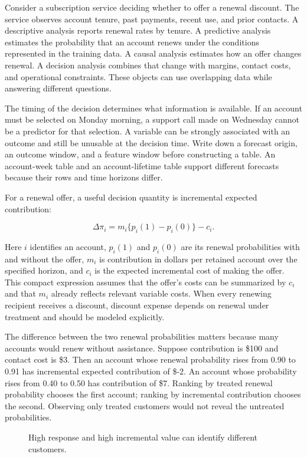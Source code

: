 \noindent Consider a subscription service deciding whether to offer a renewal
discount. The service observes account tenure, past payments, recent
use, and prior contacts. A descriptive analysis reports renewal rates by
tenure. A predictive analysis estimates the probability that an account
renews under the conditions represented in the training data. A causal
analysis estimates how an offer changes renewal. A decision analysis
combines that change with margins, contact costs, and operational
constraints. These objects can use overlapping data while answering
different questions.

The timing of the decision determines what information is available. If
an account must be selected on Monday morning, a support call made on
Wednesday cannot be a predictor for that selection. A variable can be
strongly associated with an outcome and still be unusable at the
decision time. Write down a forecast origin, an outcome window, and a
feature window before constructing a table. An account-week table and an
account-lifetime table support different forecasts because their rows
and time horizons differ.

For a renewal offer, a useful decision quantity is incremental expected
contribution:

\[
\Delta\pi_i=m_i\{p_i(1)-p_i(0)\}-c_i.
\]

Here \(i\) identifies an account, \(p_i(1)\) and \(p_i(0)\) are its
renewal probabilities with and without the offer, \(m_i\) is
contribution in dollars per retained account over the specified horizon,
and \(c_i\) is the expected incremental cost of making the offer. This
compact expression assumes that the offer's costs can be summarized by
\(c_i\) and that \(m_i\) already reflects relevant variable costs. When
every renewing recipient receives a discount, discount expense depends
on renewal under treatment and should be modeled explicitly.

The difference between the two renewal probabilities matters because
many accounts would renew without assistance. Suppose contribution is
\$100 and contact cost is \$3. Then an account whose renewal probability
rises from 0.90 to 0.91 has incremental expected contribution of \$-2.
An account whose probability rises from 0.40 to 0.50 has contribution of
\$7. Ranking by treated renewal probability chooses the first account;
ranking by incremental contribution chooses the second. Observing only
treated customers would not reveal the untreated probabilities.

\begin{figure}[htbp]
\centering

\caption{High response and high incremental value can identify different customers.}\label{fig:M01_response_vs_value}
\end{figure}


